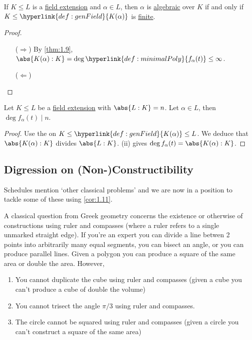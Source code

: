 \documentclass{article}
\begin{document}
\begin{ncor}\label{cor:1.10}
    If $K \leq L$ is a \hyperlink{def:fieldExt}{field extension} and $\alpha \in L$, then $\alpha$ is \hyperlink{def:algebraic}{algebraic} over $K$ if and only if $K \leq \hyperlink{def:genField}{K(\alpha)}$ is \hyperlink{def:degreeOfFieldExt}{finite}.
\end{ncor}

\begin{proof} \leavevmode
    \begin{itemize}
        \item[($\Rightarrow$)] By \cref{thm:1.9}, $\abs{K(\alpha):K} = \deg \hyperlink{def:minimalPoly}{f_\alpha(t)} \leq \infty$.
        \item [($\Leftarrow$)] 
    \end{itemize}
\end{proof}

\begin{ncor}\label{cor:1.11}
    Let $K \leq L$ be a \hyperlink{def:fieldExt}{field extension} with \hyperlink{def:degreeOfFieldExt}{$\abs{L:K} = n$}. Let $\alpha \in L$, then $\deg f_\alpha(t) \mid n$.
\end{ncor}

\begin{proof}
    Use the  on $K \leq \hyperlink{def:genField}{K(\alpha)} \leq L$.
    We deduce that $\abs{K(\alpha):K}$ divides $\abs{L:K}$.
    (ii) gives $\deg f_\alpha(t) = \abs{K(\alpha) : K}$.
\end{proof}

\subsection{Digression on (Non-)Constructibility}
Schedules mention `other classical problems' and we are now in a position to tackle some of these using \cref{cor:1.11}.

A classical question from Greek geometry concerns the existence or otherwise of constructions using ruler and compasses (where a ruler refers to a single unmarked straight edge).
If you're an expert you can divide a line betwen 2 points into arbitrarily many equal segments, you can bisect an angle, or you can produce parallel lines.
Given a polygon you can produce a square of the same area or double the area. However,
\begin{enumerate}
    \item You cannot duplicate the cube using ruler and compasses (given a cube you can't produce a cube of double the volume)
    \item You cannot trisect the angle $\pi/3$ using ruler and compasses.
    \item The circle cannot be squared using ruler and compasses (given a circle you can't construct a square of the same area)
\end{enumerate}
\end{document}

